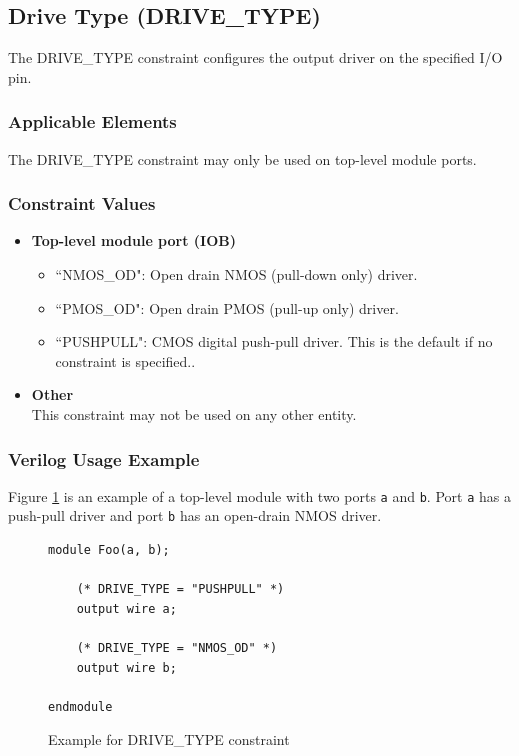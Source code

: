 \documentclass[11pt]{article}
\begin{document}

\pagebreak
\subsection{Drive Type (DRIVE\_TYPE)}

The DRIVE\_TYPE constraint configures the output driver on the specified I/O pin.

\subsubsection{Applicable Elements}
The DRIVE\_TYPE constraint may only be used on top-level module ports. 

\subsubsection{Constraint Values}
\begin{itemize}
\item {\bfseries Top-level module port (IOB)}
	\begin{itemize}
		\item ``NMOS\_OD": Open drain NMOS (pull-down only) driver.
		\item ``PMOS\_OD": Open drain PMOS (pull-up only) driver.
		\item ``PUSHPULL": CMOS digital push-pull driver. This is the default if no constraint is specified..
	\end{itemize}
\item {\bfseries Other} \\
This constraint may not be used on any other entity.
\end{itemize}

\subsubsection{Verilog Usage Example}

Figure \ref{constraint-drivetype} is an example of a top-level module with two ports \texttt{a} and \texttt{b}. Port 
\texttt{a} has a push-pull driver and port \texttt{b} has an open-drain NMOS driver.

\begin{figure}[h]
\begin{lstlisting}
module Foo(a, b);

	(* DRIVE_TYPE = "PUSHPULL" *)
	output wire a;

	(* DRIVE_TYPE = "NMOS_OD" *)
	output wire b;
	
endmodule
\end{lstlisting}
\caption{Example for DRIVE\_TYPE constraint}
\label{constraint-drivetype}
\end{figure}
\end{document}
